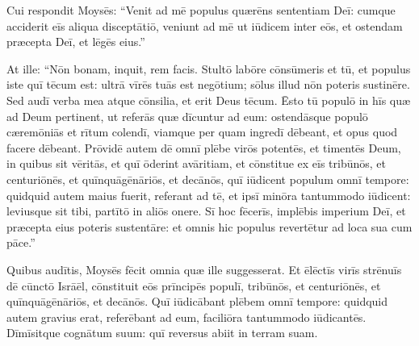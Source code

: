 Cui respondit
Moysēs: ``Venit ad mē populus quærēns sententiam Deī: 
cumque acciderit
eīs aliqua disceptātiō, veniunt ad mē ut
iūdicem inter eōs, et ostendam
præcepta Deī, et lēgēs eius.''

At ille: ``Nōn bonam, inquit, rem facis. 
Stultō labōre cōnsūmeris et tū, et
populus iste quī tēcum est: ultrā vīrēs tuās est negōtium; sōlus illud
nōn poteris sustinēre. 
Sed audī verba mea atque cōnsilia, et erit Deus
tēcum. Ēsto tū populō in hīs quæ ad Deum pertinent, ut referās quæ
dīcuntur ad eum: 
ostendāsque populō cæremōniās et
rītum colendī,
viamque per quam ingredī dēbeant, et opus quod
facere dēbeant. 
Prōvidē autem dē omnī plēbe virōs
potentēs, et timentēs Deum, in quibus sit vēritās, et quī
ōderint avāritiam, et cōnstitue ex eīs
tribūnōs, et centuriōnēs, et
quīnquāgēnāriōs, et decānōs, 
quī
iūdicent populum omnī tempore: quidquid autem maius fuerit, referant ad
tē, et ipsī minōra tantummodo iūdicent: leviusque sit
tibi, partītō in aliōs onere.
Sī hoc fēcerīs, implēbis imperium Deī, et præcepta eius poteris
sustentāre: et omnis hic populus revertētur ad
loca sua cum pāce.'' 

Quibus audītis, Moysēs fēcit omnia quæ ille
suggesserat. 
Et ēlēctīs virīs strēnuīs
dē cūnctō Isrāēl, cōnstituit eōs prīncipēs populī, tribūnōs, et
centuriōnēs, et quīnquāgēnāriōs, et decānōs. 
Quī iūdicābant
plēbem omnī tempore: quidquid autem gravius erat,
referēbant ad eum, faciliōra tantummodo iūdicantēs. 
Dīmīsitque
cognātum suum: quī reversus abiit in terram suam. 
